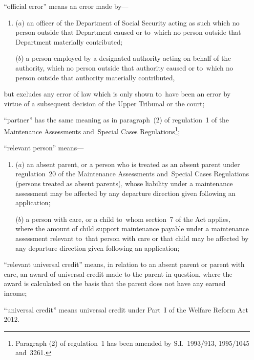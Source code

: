\documentclass[12pt,a4paper]{article}
\begin{document}
\begin{enumerate}

“official error” means an error made by—
\begin{enumerate}\item[]
    ($a$) 
    an officer of the Department of Social Security acting as such which no person outside that Department caused or to~which no person outside that Department materially contributed;


($b$) a person employed by a designated authority acting on behalf of the authority, which no person outside that authority caused or to~which no person outside that authority materially contributed,
\end{enumerate}
but excludes any error of law which is only shown to~have been an error by virtue of a subsequent decision of 
the Upper Tribunal  %
or the court;

“partner” has the same meaning as in paragraph~(2) of regulation~1 of the
Maintenance Assessments and~Special Cases Regulations\footnote{\frenchspacing Paragraph (2) of regulation~1 has been amended by S.I.~1993/913, 1995/1045 and~3261.};

“relevant person” means—
\begin{enumerate}\item[]
($a$) an absent parent, or a person who is treated as an absent parent under
regulation~20 of the Maintenance Assessments and~Special Cases Regulations
(persons treated as absent parents), whose liability under a maintenance
assessment may be affected by any departure direction given following an
application;

($b$) a person with care, or a child to~whom section~7 of the Act applies, where
the amount of child support maintenance payable under a maintenance assessment
relevant to~that person with care or that child may be affected by any departure
direction given following an application;
\end{enumerate}

“relevant universal credit” means, in relation to an absent parent or parent with care, an award of universal credit made to the parent in question, where the award is calculated on the basis that the parent does not have any earned income;

“universal credit” means universal credit under Part~I of the Welfare Reform Act 2012.
\end{enumerate}
\end{document}

